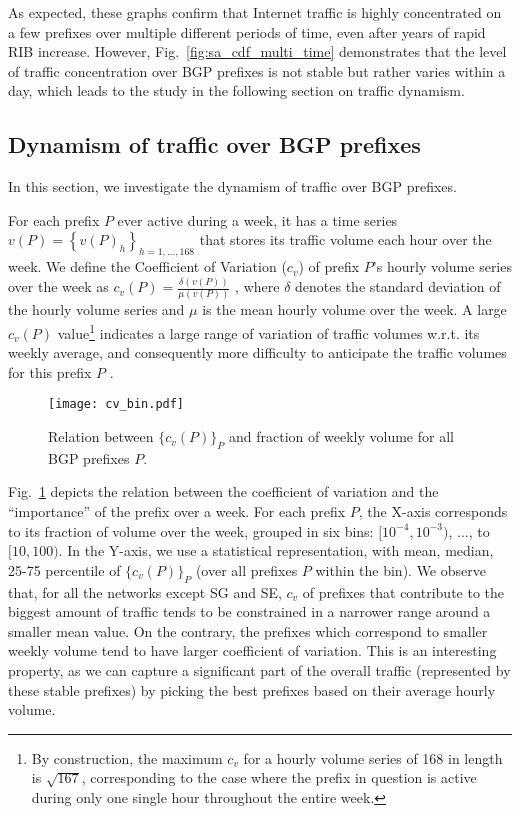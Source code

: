\documentclass[10pt, conference,letterpaper]{IEEEtran}
\begin{document}
As expected, these graphs confirm that Internet traffic is highly concentrated on a few prefixes over multiple different periods of time, even after years of rapid RIB increase.
However, Fig.~\ref{fig:sa_cdf_multi_time} demonstrates that the level of traffic concentration over BGP prefixes is not stable but rather varies within a day, which leads to the study in the following section on traffic dynamism.

\subsection{Dynamism of traffic over BGP prefixes}
\label{sec:dyna}
In this section, we investigate the dynamism of traffic over BGP prefixes. 


For each prefix $P$ ever active during a week, it has a time series $v(P)={\left\{ v(P)_h\right\} }_{h=1, \dots, 168}$ that
stores its traffic volume each hour over the week. 
We define the Coefficient of Variation ($c_v$) of prefix $P$'s hourly volume series over the week as
$c_v(P) = \frac{\delta(v(P))}{\mu(v(P))}$ ,
where $\delta$ denotes the standard deviation of the hourly volume series and $\mu$ is the mean hourly volume over the week.
A large $c_v(P)$ value\footnote{By construction, the maximum $c_v$ for a hourly volume series of 168 in length is $\sqrt{167}$, corresponding to the case where the prefix in question is active during only one single hour throughout the entire week.} indicates  a large range of variation of traffic volumes w.r.t. its weekly average, and consequently more difficulty to anticipate the traffic volumes for this prefix $P$ \cite{He2005}.
\begin{figure}[!tb]
\centering
\texttt{[image: cv\_bin.pdf]}
\caption{Relation between $\{c_v(P)\}_P$  and  fraction of weekly volume for all BGP prefixes $P$. 
}
\label{fig:cv}
\end{figure}

Fig.~\ref{fig:cv} depicts the relation between the coefficient of variation and the ``importance'' of the prefix over a week. For each prefix $P$,  the X-axis corresponds to its fraction of volume over the week, grouped in six bins: $[10^{-4}, 10^{-3})$, $\dots$, to $[10,100)$. In the Y-axis, we use a statistical representation, with mean, median, 25-75 percentile of $\{c_v(P)\}_P$ (over all prefixes $P$ within the bin).
We observe that, for all the networks except SG and SE, $c_v$ of prefixes that contribute to the biggest amount of traffic tends to be constrained in a narrower range around a smaller mean value. On the contrary, the prefixes which correspond to smaller weekly volume tend to have larger coefficient of variation. 
This is an interesting property, as we can capture a significant part of the overall traffic (represented by these stable prefixes) by picking the best prefixes based on their average hourly volume. 
\end{document}
